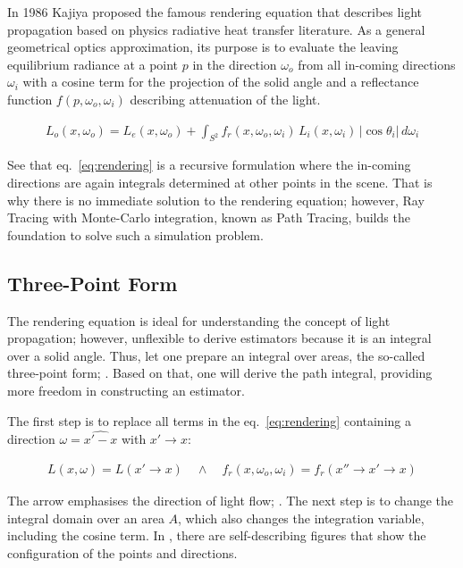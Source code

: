 In 1986 Kajiya \cite{kajiya_rendering_1986} proposed the famous rendering equation that describes light propagation based on physics radiative heat transfer literature.
As a general geometrical optics approximation, its purpose is to evaluate the leaving equilibrium radiance at a point $p$ in the direction $\omega_o$ from all in-coming directions $\omega_i$ with a cosine term for the projection of the solid angle and a reflectance function $f(p, \omega_o, \omega_i)$ describing attenuation of the light.

\begin{align}
L_o(x,\omega_o)=L_e(x,\omega_o)+\int_{S^2}f_r(x,\omega_o,\omega_i)\,L_i(x,\omega_i)\,\left|\cos\theta_i\right|\,d\omega_i
\label{eq:rendering}
\end{align}

See that eq.~\ref{eq:rendering} is a recursive formulation where the in-coming directions are again integrals determined at other points in the scene.
That is why there is no immediate solution to the rendering equation; however, Ray Tracing with Monte-Carlo integration, known as Path Tracing, builds the foundation to solve such a simulation problem.

\subsection*{Three-Point Form}

The rendering equation is ideal for understanding the concept of light propagation; however, unflexible to derive estimators because it is an integral over a solid angle.
Thus, let one prepare an integral over areas, the so-called three-point form; \cite{veach_robust_1997}.
Based on that, one will derive the path integral, providing more freedom in constructing an estimator.

The first step is to replace all terms in the eq.~\ref{eq:rendering} containing a direction $\omega=\widehat{x'-x}$ with $x'\rightarrow x$:

\begin{align*}
L(x,\omega)=L(x'\rightarrow x)\quad\wedge\quad f_r(x,\omega_o,\omega_i)=f_r(x''\rightarrow x'\rightarrow x)
\end{align*}

The arrow emphasises the direction of light flow; \cite{veach_robust_1997}.
The next step is to change the integral domain over an area $A$, which also changes the integration variable, including the cosine term.
In \cite{kajiya_rendering_1986}, there are self-describing figures that show the configuration of the points and directions.

